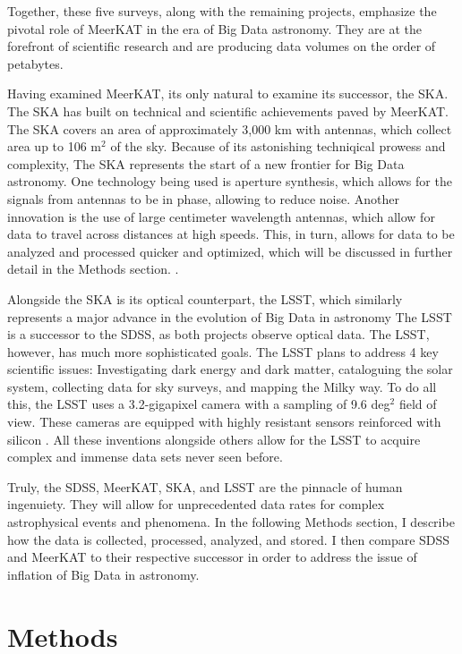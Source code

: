 \documentclass[preprint2,linenumbers, longauthor]{aastex631}
\begin{document}
Together, these five surveys, along with the remaining projects, emphasize the pivotal role of MeerKAT in the era of Big Data astronomy. They are at the forefront of scientific research and are producing data volumes on the order of petabytes.

Having examined MeerKAT, its only natural to examine its successor, the SKA. The SKA has built on technical and scientific achievements paved by MeerKAT.
The SKA covers an area of approximately 3,000 km with antennas, which collect area up to 106 m$^2$ of the sky. Because of its astonishing techniqical prowess and complexity, The SKA represents the start of a new frontier for Big Data astronomy.
One technology being used is aperture synthesis, which allows for the signals from antennas to be in phase, allowing to reduce noise. Another innovation is the use of large centimeter wavelength antennas, which allow for data to travel across distances at high speeds. This, in turn, allows for data to be analyzed and processed quicker and optimized, which will be discussed in further detail in the Methods section. \cite{dewdneySquareKilometreArray2009}.

Alongside the SKA is its optical counterpart, the LSST, which similarly represents a major advance in the evolution of Big Data in astronomy
The LSST is a successor to the SDSS, as both projects observe optical data. The LSST, however, has much more sophisticated goals. The LSST plans to address 4 key scientific issues: Investigating dark energy and dark matter, cataloguing the solar system, collecting data for sky surveys, and mapping the Milky way.
To do all this, the LSST uses a 3.2-gigapixel camera with a sampling of 9.6 deg$^2$ field of view. These cameras are equipped with highly resistant sensors reinforced with silicon \cite{ivezicLSSTScienceDrivers2019}. All these inventions alongside others allow for the LSST to acquire complex and immense data sets never seen before.

Truly, the SDSS, MeerKAT, SKA, and LSST are the pinnacle of human ingenuiety. They will allow for unprecedented data rates for complex astrophysical events and phenomena.
In the following Methods section, I describe how the data is collected, processed, analyzed, and stored. I then compare SDSS and MeerKAT to their respective successor in order to address the issue of inflation of Big Data in astronomy.












\section{Methods}


\end{document}
